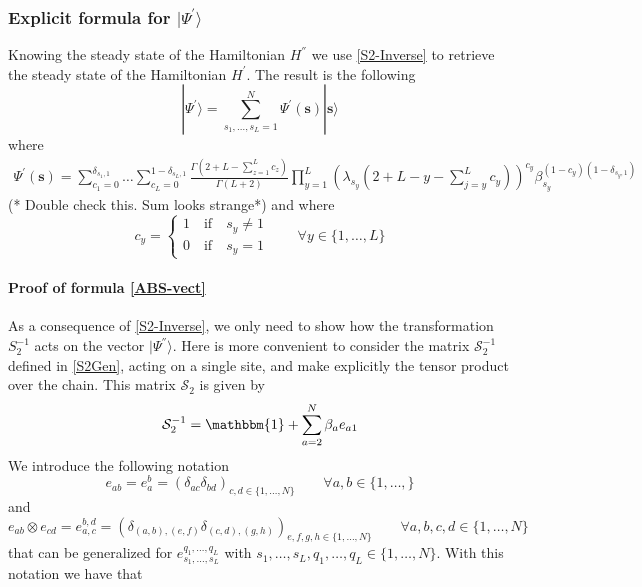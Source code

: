 \documentclass[11pt]{article}
\numberwithin{equation}{section}
\numberwithin{equation}{subsection}
\newcommand{\com}[1]{{ (* {\color{red}\small #1}*)}}
\begin{document}
\subsubsection{Explicit formula for $|\Psi^{'}\rangle$}\label{subsectionSSdual}
Knowing the steady state  of the Hamiltonian $H^{''}$ we use \eqref{S2-Inverse} to retrieve the steady state of the Hamiltonian $H^{'}$. The result is the following 
\begin{equation}\label{ABS-vect}
    |\Psi^{'}\rangle =\sum_{s_{1},\ldots,s_{L}=1}^{N}\Psi^{'}(\bm{s})|\bm{s}\rangle 
\end{equation}
where  
\begin{equation}\label{ABS}
		\begin{split}
			\Psi^{'}(\bm{s})=\sum_{c_{1}=0}^{\delta_{s_{1},1}}\ldots\sum_{c_{L}=0}^{1-\delta_{s_{L},1}}\frac{\Gamma(2+L-\sum_{z=1}^{L}c_{z})}{\Gamma(L+2)}\prod_{y=1}^{L}\left(\lambda_{s_{y}}\left(2+L-y-\sum_{j=y}^{L}c_{y}\right)\right)^{c_{y}}\beta_{s_{y}}^{(1-c_{y})(1-\delta_{s_{y},1})}
		\end{split}
	\end{equation} 
	\com{Double check this. Sum looks strange}
and where
 \begin{equation}\label{CiEquation}
	c_{y}=\begin{cases}
		1\quad \text{if}\quad s_{y}\neq 1\\
		0\quad \text{if}\quad s_{y}=1
	\end{cases}\qquad \forall y\in \{1,\ldots,L\}
\end{equation}
\paragraph{Proof of formula \eqref{ABS-vect}} As a consequence of \eqref{S2-Inverse}, we only need to show how the transformation $S_{2}^{-1}$ acts on the vector $|\Psi^{''}\rangle$. Here is more convenient to consider the matrix $\mathcal{S}_{2}^{-1}$ defined in \eqref{S2Gen}, acting on a single site, and make explicitly the tensor product over the chain. This matrix $\mathcal{S}_{2}$ is given by 
\begin{equation}
   \mathcal{S}_{2}^{-1}=\mathbbm{1}+\sum_{a=2}^{N}\beta_{a}e_{a1}
\end{equation}
We introduce the following notation
\begin{equation}\label{notation1}
    e_{ab}=e_{a}^{b}=\left(\delta_{ac}\delta_{bd}\right)_{c,d\in\{1,\ldots,N\}}\qquad \forall a,b\in \{1,\ldots,\}
\end{equation}
and 
\begin{equation}\label{notation2}
    e_{ab}\otimes e_{cd}=e_{a,c}^{b,d}=\left(\delta_{(a,b),(e,f)}\delta_{(c,d),(g,h)}\right)_{e,f,g,h\in \{1,\ldots,N\}}\qquad \forall a,b,c,d\in \{1,\ldots,N\}
    \end{equation}
    that can be generalized for $e_{s_{1},\ldots,s_{L}}^{q_{1},\ldots,q_{L}}$ with $s_{1},\ldots,s_{L},q_{1},\ldots,q_{L}\in \{1,\ldots,N\}$. With this notation we have that
    
\end{document}
